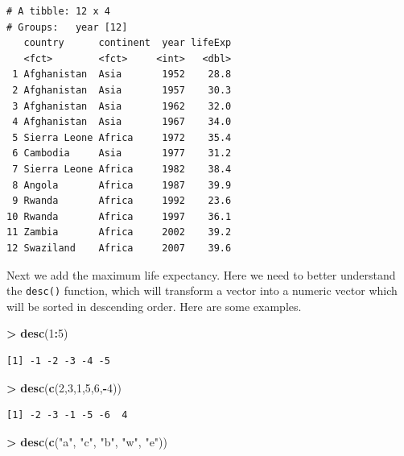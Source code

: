 \documentclass[
]{krantz}
\makeatletter
\newenvironment{Shaded}{\begin{snugshade}}{\end{snugshade}}
\newcommand{\DecValTok}[1]{\textcolor[rgb]{0.06,0.06,0.06}{#1}}
\newcommand{\KeywordTok}[1]{\textcolor[rgb]{0.27,0.27,0.27}{\textbf{#1}}}
\newcommand{\NormalTok}[1]{#1}
\newcommand{\OperatorTok}[1]{\textcolor[rgb]{0.43,0.43,0.43}{\textbf{#1}}}
\newcommand{\StringTok}[1]{\textcolor[rgb]{0.5,0.5,0.5}{#1}}
\newenvironment{kframe}{%
\medskip{}
\setlength{\fboxsep}{.8em}
 \def\at@end@of@kframe{}%
 \ifinner\ifhmode%
  \def\at@end@of@kframe{\end{minipage}}%
  \begin{minipage}{\columnwidth}%
 \fi\fi%
 \def\FrameCommand##1{\hskip\@totalleftmargin \hskip-\fboxsep
 \colorbox{shadecolor}{##1}\hskip-\fboxsep
     \hskip-\linewidth \hskip-\@totalleftmargin \hskip\columnwidth}%
 \MakeFramed {\advance\hsize-\width
   \@totalleftmargin\z@ \linewidth\hsize
   \@setminipage}}%
 {\par\unskip\endMakeFramed%
 \at@end@of@kframe}
\renewenvironment{Shaded}{\begin{kframe}}{\end{kframe}}
\makeatother
\begin{document}
\begin{verbatim}
# A tibble: 12 x 4
# Groups:   year [12]
   country      continent  year lifeExp
   <fct>        <fct>     <int>   <dbl>
 1 Afghanistan  Asia       1952    28.8
 2 Afghanistan  Asia       1957    30.3
 3 Afghanistan  Asia       1962    32.0
 4 Afghanistan  Asia       1967    34.0
 5 Sierra Leone Africa     1972    35.4
 6 Cambodia     Asia       1977    31.2
 7 Sierra Leone Africa     1982    38.4
 8 Angola       Africa     1987    39.9
 9 Rwanda       Africa     1992    23.6
10 Rwanda       Africa     1997    36.1
11 Zambia       Africa     2002    39.2
12 Swaziland    Africa     2007    39.6
\end{verbatim}

Next we add the maximum life expectancy. Here we need to better understand the \texttt{desc()} function, which will transform a vector into a numeric vector which will be sorted in descending order. Here are some examples.

\begin{Shaded}
\begin{Highlighting}[]
\OperatorTok{\textgreater{}}\StringTok{ }\KeywordTok{desc}\NormalTok{(}\DecValTok{1}\OperatorTok{:}\DecValTok{5}\NormalTok{)}
\end{Highlighting}
\end{Shaded}

\begin{verbatim}
[1] -1 -2 -3 -4 -5
\end{verbatim}

\begin{Shaded}
\begin{Highlighting}[]
\OperatorTok{\textgreater{}}\StringTok{ }\KeywordTok{desc}\NormalTok{(}\KeywordTok{c}\NormalTok{(}\DecValTok{2}\NormalTok{,}\DecValTok{3}\NormalTok{,}\DecValTok{1}\NormalTok{,}\DecValTok{5}\NormalTok{,}\DecValTok{6}\NormalTok{,}\OperatorTok{{-}}\DecValTok{4}\NormalTok{))}
\end{Highlighting}
\end{Shaded}

\begin{verbatim}
[1] -2 -3 -1 -5 -6  4
\end{verbatim}

\begin{Shaded}
\begin{Highlighting}[]
\OperatorTok{\textgreater{}}\StringTok{ }\KeywordTok{desc}\NormalTok{(}\KeywordTok{c}\NormalTok{(}\StringTok{"a"}\NormalTok{, }\StringTok{"c"}\NormalTok{, }\StringTok{"b"}\NormalTok{, }\StringTok{"w"}\NormalTok{, }\StringTok{"e"}\NormalTok{))}
\end{Highlighting}
\end{Shaded}
\end{document}
